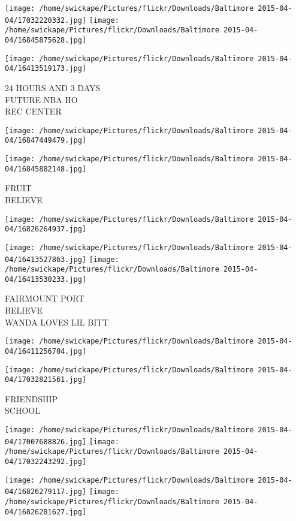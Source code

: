 \documentclass[10pt,letterpaper]{article}
\begin{document}
\texttt{[image: /home/swickape/Pictures/flickr/Downloads/Baltimore 2015-04-04/17032220332.jpg]}
\texttt{[image: /home/swickape/Pictures/flickr/Downloads/Baltimore 2015-04-04/16845875628.jpg]}

\vspace{0.25in}
\texttt{[image: /home/swickape/Pictures/flickr/Downloads/Baltimore 2015-04-04/16413519173.jpg]}

24 HOURS AND 3 DAYS\\
FUTURE NBA HO\\
REC CENTER
\pagebreak

\texttt{[image: /home/swickape/Pictures/flickr/Downloads/Baltimore 2015-04-04/16847449479.jpg]}

\vspace{0.25in}
\texttt{[image: /home/swickape/Pictures/flickr/Downloads/Baltimore 2015-04-04/16845882148.jpg]}

FRUIT\\
BELIEVE
\pagebreak

\texttt{[image: /home/swickape/Pictures/flickr/Downloads/Baltimore 2015-04-04/16826264937.jpg]}

\vspace{0.25in}
\texttt{[image: /home/swickape/Pictures/flickr/Downloads/Baltimore 2015-04-04/16413527863.jpg]}
\texttt{[image: /home/swickape/Pictures/flickr/Downloads/Baltimore 2015-04-04/16413530233.jpg]}

FAIRMOUNT PORT\\
BELIEVE\\
WANDA LOVES LIL BITT
\pagebreak

\texttt{[image: /home/swickape/Pictures/flickr/Downloads/Baltimore 2015-04-04/16411256704.jpg]}

\vspace{0.25in}
\texttt{[image: /home/swickape/Pictures/flickr/Downloads/Baltimore 2015-04-04/17032821561.jpg]}

FRIENDSHIP\\
SCHOOL
\pagebreak

\texttt{[image: /home/swickape/Pictures/flickr/Downloads/Baltimore 2015-04-04/17007688826.jpg]}
\texttt{[image: /home/swickape/Pictures/flickr/Downloads/Baltimore 2015-04-04/17032243292.jpg]}

\texttt{[image: /home/swickape/Pictures/flickr/Downloads/Baltimore 2015-04-04/16826279117.jpg]}
\texttt{[image: /home/swickape/Pictures/flickr/Downloads/Baltimore 2015-04-04/16826281627.jpg]}
\end{document}
